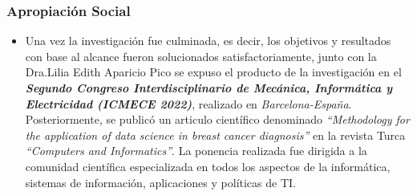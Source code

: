 \documentclass[xcolor=dvipsnames,xcolor=table,10pt]{beamer} %
\begin{document}
\begin{frame}
	\frametitle{Apropiación Social}
	\begin{itemize}\justifying
		\item Una vez la investigación fue culminada, es decir, los objetivos y resultados con base al alcance fueron solucionados satisfactoriamente, junto con la Dra.Lilia Edith Aparicio Pico se expuso el producto de la investigación en el \textit{\textbf{Segundo Congreso Interdisciplinario de Mecánica, Informática y Electricidad (ICMECE 2022)}}, realizado en \textit{Barcelona-España}. Posteriormente, se publicó un articulo científico denominado \textit{``Methodology for the application of data science in breast cancer diagnosis''} en la revista Turca \textit{``Computers and Informatics''}. La ponencia realizada fue dirigida a la comunidad científica especializada en todos los aspectos de la informática, sistemas de información, aplicaciones y políticas de TI.
	\end{itemize}
\end{frame}
\end{document}
